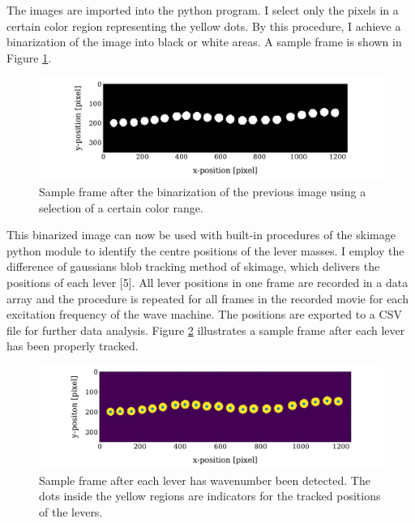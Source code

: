 \documentclass[12pt]{article}
\begin{document}
The images are imported into the python program. I select only the pixels in a certain color region representing the yellow dots. By this procedure, I achieve a binarization of the image into black or white areas. A sample frame is shown in Figure \ref{fig:binary}.
\begin{figure}[hbt]
  \includegraphics[width=.8\columnwidth]{colour_channel_adjustment}
  \caption{Sample frame after the binarization of the previous image using a selection of a certain color range.} \label{fig:binary}
\end{figure}
This binarized image can now be used with built-in procedures of the skimage python module to identify the centre positions of the lever masses. I employ the difference of gaussians blob tracking method of skimage, which delivers the positions of each lever [5]. All lever positions in one frame are recorded in a data array and the procedure is repeated for all frames in the recorded movie for each excitation frequency of the wave machine.  The positions are exported to a CSV file for further data analysis. Figure \ref{fig:tracked} illustrates a sample frame after each lever has been properly tracked.
\begin{figure}[hbt]
  \includegraphics[width=.8\columnwidth]{blob_tracking}
  \caption{Sample frame after each lever has wavenumber been detected. The dots inside the yellow regions are indicators for the tracked positions of the levers.}\label{fig:tracked}
\end{figure}
\end{document}
